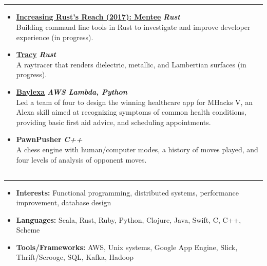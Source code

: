 \documentclass[5pt,letterpaper]{article}
\begin{document}
\subsection*{}
\hrule
\vspace{1.0em}
\begin{itemize}[leftmargin=1em, noitemsep]
  \item []
    \textbf{\href{https://blog.rust-lang.org/2017/06/27/Increasing-Rusts-Reach.html}{Increasing
    Rust's Reach (2017): Mentee}} \hfill \textbf{\emph{Rust}}
    \\
    Building command line tools in Rust to investigate and improve developer
    experience (in progress).
  \item[]
    \textbf{\href{https://github.com/arshiamufti/tracy}{Tracy}} \hfill \textbf{\emph{Rust}}
    \\
    A raytracer that renders dielectric, metallic, and Lambertian surfaces (in progress).
  \item[]
    {\href{http://devpost.com/software/baylexa-fv149r}{\textbf{Baylexa}}}
    \hfill \textbf{\emph{AWS Lambda, Python}}
    \\
    Led a team of four to design the winning healthcare app for MHacks V, an
    Alexa skill aimed at recognizing symptoms of common health conditions,
    providing basic first aid advice, and scheduling appointments.
  \item[]
    \textbf{PawnPusher} \hfill \textbf{\emph{C++}}
    \\
    A chess engine with human/computer modes, a history of moves played, and
    four levels of analysis of opponent moves.
\end{itemize}


\subsection*{}
\hrule
\vspace{1.0em}
\begin{itemize}[leftmargin=1em, noitemsep]
  \item[]
    \textbf{Interests:} Functional programming, distributed systems,
    performance improvement, database design
  \item[]
    \textbf{Languages:} Scala, Rust, Ruby, Python, Clojure, Java, Swift, C, C++, Scheme
  \item[]
    \textbf{Tools/Frameworks:} AWS, Unix systems, Google App Engine, Slick,
    Thrift/Scrooge, SQL, Kafka, Hadoop
\end{itemize}
\end{document}
